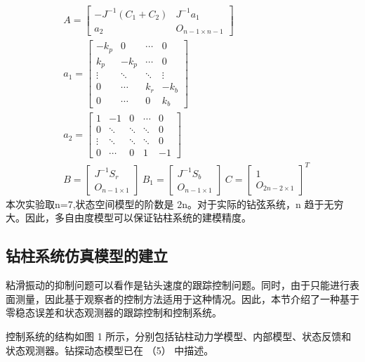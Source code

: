 \documentclass[12pt,hyperref,a4paper,UTF8]{ctexart}
\begin{document}
	\begin{align*} & A=\begin{bmatrix} -J^{-1}(C_{1}+C_{2}) & J^{-1}a_{1}\\ a_{2} & O_{n-1\times n-1} \end{bmatrix}\\ & a_{1}=\begin{bmatrix} -k_{p} & 0 & \cdots & 0 \\ k_{p} & -k_{p} & \cdots & 0\\ \vdots & \ddots & \ddots & \vdots\\ 0 & \cdots & k_{r} & -k_{b}\\ 0 & \cdots & 0 & k_{b} \end{bmatrix}\\ & a_{2}=\begin{bmatrix} 1 & -1 & 0 & \cdots & 0\\ 0 & \ddots & \ddots & \ddots & 0\\ \vdots & \ddots & \ddots & \ddots & 0\\ 0 & \cdots & 0 & 1 & -1 \end{bmatrix}\\ & B=\begin{bmatrix} J^{-1}S_{r}\\ O_{n-1\times 1} \end{bmatrix}\ B_{1}=\begin{bmatrix} J^{-1}S_{b}\\ O_{n-1\times 1} \end{bmatrix}\ C=\begin{bmatrix} 1\\ O_{2n-2\times 1} \end{bmatrix}^{T} \end{align*}
	本次实验取n=7,状态空间模型的阶数是 2n。对于实际的钻弦系统，n 趋于无穷大。因此，多自由度模型可以保证钻柱系统的建模精度\cite{chengjun}。
	
	
	
	
	\subsection{钻柱系统仿真模型的建立}
	粘滑振动的抑制问题可以看作是钻头速度的跟踪控制问题。同时，由于只能进行表面测量，因此基于观察者的控制方法适用于这种情况。因此，本节介绍了一种基于零稳态误差和状态观测器的跟踪控制和控制系统。
	
	控制系统的结构如图 1 所示，分别包括钻柱动力学模型、内部模型、状态反馈和状态观测器。钻探动态模型已在 （5） 中描述。
	
	
	
\end{document}
